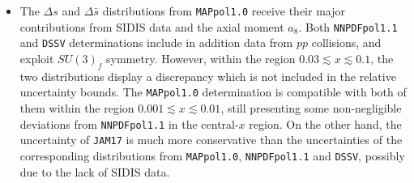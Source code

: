 \begin{itemize}
  \item The $\Delta s$ and $\Delta \bar{s}$ distributions from \texttt{MAPpol1.0} receive their major contributions from SIDIS data and the axial moment $a_8$. Both \texttt{NNPDFpol1.1} and \texttt{DSSV} determinations include in addition data from $pp$ collisions, and exploit $SU(3)_f$ symmetry. However, within the region $0.03 \lesssim x \lesssim 0.1$, the two distributions display a discrepancy which is not included in the relative uncertainty bounds. The \texttt{MAPpol1.0} determination is compatible with both of them within the region $0.001 \lesssim x \lesssim 0.01$, still presenting some non-negligible deviations from \texttt{NNPDFpol1.1} in the central-$x$ region. On the other hand, the uncertainty of \texttt{JAM17} is much more conservative than the uncertainties of the corresponding distributions from \texttt{MAPpol1.0}, \texttt{NNPDFpol1.1} and \texttt{DSSV}, possibly due to the lack of SIDIS data.
\end{itemize}


